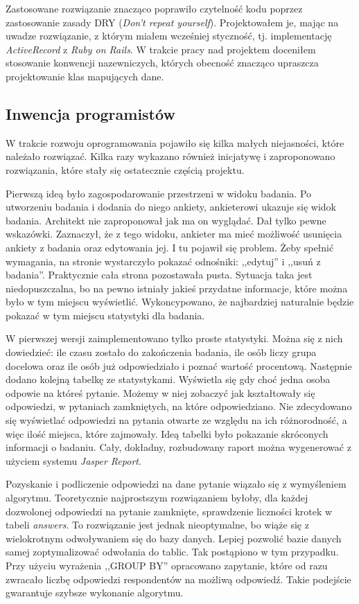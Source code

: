 Zastosowane rozwiązanie znacząco poprawiło czytelność kodu poprzez zastosowanie zasady DRY (\emph{Don't repeat yourself}). Projektowałem je, mając na uwadze rozwiązanie, z którym miałem wcześniej styczność, tj. implementację \emph{ActiveRecord} z \emph{Ruby on Rails}. W trakcie pracy nad projektem doceniłem stosowanie konwencji nazewniczych, których obecność znacząco upraszcza projektowanie klas mapujących dane.

\subsection{Inwencja programistów}
\label{Chapter62d}

W trakcie rozwoju oprogramowania pojawiło się kilka małych niejasności, które należało rozwiązać. Kilka razy wykazano również inicjatywę i zaproponowano rozwiązania, które stały się ostatecznie częścią projektu.

Pierwszą ideą było zagospodarowanie przestrzeni w widoku badania. Po utworzeniu badania i dodania do niego ankiety, ankieterowi ukazuje się widok badania. Architekt nie zaproponował jak ma on wyglądać. Dał tylko pewne wskazówki. Zaznaczył, że z tego widoku, ankieter ma mieć możliwość usunięcia ankiety z badania oraz edytowania jej. I tu pojawił się problem. Żeby spełnić wymagania, na stronie wystarczyło pokazać odnośniki: ,,edytuj'' i ,,usuń z badania''. Praktycznie cała strona pozostawała pusta. Sytuacja taka jest niedopuszczalna, bo na pewno istniały jakieś przydatne informacje, które można było w tym miejscu wyświetlić. Wykoncypowano, że najbardziej naturalnie będzie pokazać w tym miejscu statystyki dla badania.

W pierwszej wersji zaimplementowano tylko proste statystyki. Można się z nich dowiedzieć: ile czasu zostało do zakończenia badania, ile osób liczy grupa docelowa oraz ile osób już odpowiedziało i poznać wartość procentową. Następnie dodano kolejną tabelkę ze statystykami. Wyświetla się gdy choć jedna osoba odpowie na któreś pytanie. Możemy w niej zobaczyć jak kształtowały się odpowiedzi, w pytaniach zamkniętych, na które odpowiedziano. Nie zdecydowano się wyświetlać odpowiedzi na pytania otwarte ze względu na ich różnorodność, a więc ilość miejsca, które zajmowały. Ideą tabelki było pokazanie skróconych informacji o badaniu. Cały, dokładny, rozbudowany raport można wygenerować z użyciem systemu \emph{Jasper Report}.

Pozyskanie i podliczenie odpowiedzi na dane pytanie wiązało się z wymyśleniem algorytmu. Teoretycznie najprostszym rozwiązaniem byłoby, dla każdej dozwolonej odpowiedzi na pytanie zamknięte, sprawdzenie liczności krotek w tabeli \emph{answers}. To rozwiązanie jest jednak nieoptymalne, bo wiąże się z wielokrotnym odwoływaniem się do bazy danych. Lepiej pozwolić bazie danych samej zoptymalizować odwołania do tablic. Tak postąpiono w tym przypadku. Przy użyciu wyrażenia ,,GROUP BY'' opracowano zapytanie, które od razu zwracało liczbę odpowiedzi respondentów na możliwą odpowiedź. Takie podejście gwarantuje szybsze wykonanie algorytmu.

